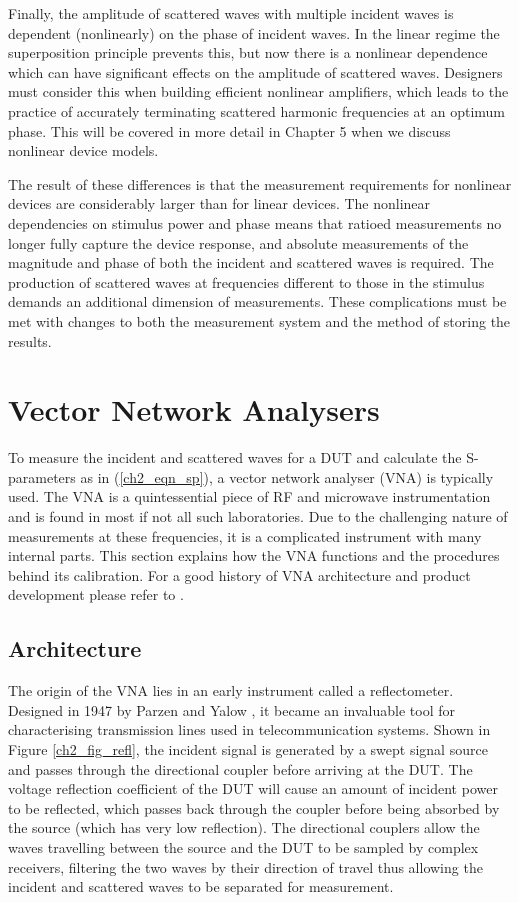 \documentclass[../thesis/thesis.tex]{subfiles}
\begin{document}
\begin{refsection}
Finally, the amplitude of scattered waves with multiple incident waves is dependent (nonlinearly) on the phase of incident waves. In the linear regime the superposition principle prevents this, but now there is a nonlinear dependence which can have significant effects on the amplitude of scattered waves. Designers must consider this when building efficient nonlinear amplifiers, which leads to the practice of accurately terminating scattered harmonic frequencies at an optimum phase. This will be covered in more detail in Chapter 5 when we discuss nonlinear device models. 

The result of these differences is that the measurement requirements for nonlinear devices are considerably larger than for linear devices. The nonlinear dependencies on stimulus power and phase means that ratioed measurements no longer fully capture the device response, and absolute measurements of the magnitude and phase of both the incident and scattered waves is required. The production of scattered waves at frequencies different to those in the stimulus demands an additional dimension of measurements. These complications must be met with changes to both the measurement system and the method of storing the results.

\section{Vector Network Analysers}

To measure the incident and scattered waves for a DUT and calculate the S-parameters as in (\ref{ch2_eqn_sp}), a vector network analyser (VNA) is typically used. The VNA is a quintessential piece of RF and microwave instrumentation and is found in most if not all such laboratories. Due to the challenging nature of measurements at these frequencies, it is a complicated instrument with many internal parts. This section explains how the VNA functions and the procedures behind its calibration. For a good history of VNA architecture and product development please refer to \cite{Teppati_2013,Dunsmore_2012,Rytting_2008}.

\subsection{Architecture}

The origin of the VNA lies in an early instrument called a reflectometer. Designed in 1947 by Parzen and Yalow \cite{Parzen_1947}, it became an invaluable tool for characterising transmission lines used in telecommunication systems. Shown in Figure \ref{ch2_fig_refl}, the incident signal is generated by a swept signal source and passes through the directional coupler before arriving at the DUT. The voltage reflection coefficient of the DUT will cause an amount of incident power to be reflected, which passes back through the coupler before being absorbed by the source (which has very low reflection). The directional couplers allow the waves travelling between the source and the DUT to be sampled by complex receivers, filtering the two waves by their direction of travel thus allowing the incident and scattered waves to be separated for measurement. 


\end{refsection}
\end{document}
